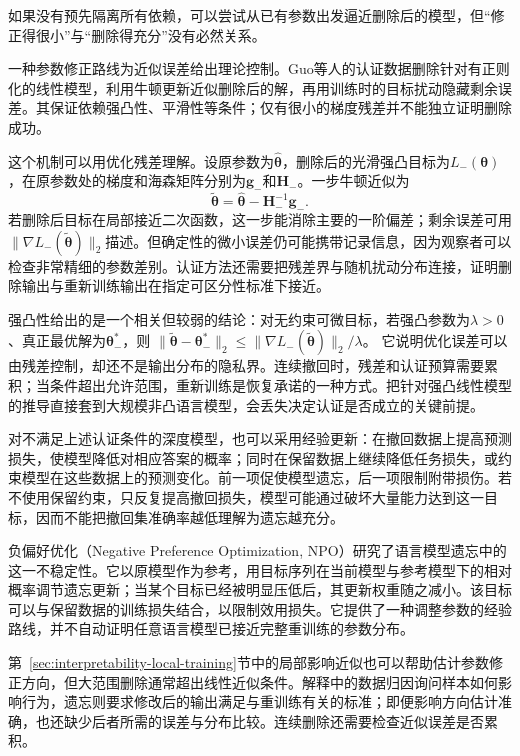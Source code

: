 如果没有预先隔离所有依赖，可以尝试从已有参数出发逼近删除后的模型，但“修正得很小”与“删除得充分”没有必然关系。

一种参数修正路线为近似误差给出理论控制。Guo等人的认证数据删除针对有正则化的线性模型，利用牛顿更新近似删除后的解，再用训练时的目标扰动隐藏剩余误差。其保证依赖强凸性、平滑性等条件；仅有很小的梯度残差并不能独立证明删除成功。

这个机制可以用优化残差理解。设原参数为$\hat{\bm\theta}$，删除后的光滑强凸目标为$L_-(\bm\theta)$，在原参数处的梯度和海森矩阵分别为$\bm g_-$和$\bm H_-$。一步牛顿近似为
\begin{equation}
 \tilde{\bm\theta}
 =\hat{\bm\theta}-\bm H_-^{-1}\bm g_-.
 \label{eq:privacy-newton-removal}
\end{equation}
若删除后目标在局部接近二次函数，这一步能消除主要的一阶偏差；剩余误差可用$\|\nabla L_-(\tilde{\bm\theta})\|_2$描述。但确定性的微小误差仍可能携带记录信息，因为观察者可以检查非常精细的参数差别。认证方法还需要把残差界与随机扰动分布连接，证明删除输出与重新训练输出在指定可区分性标准下接近。

强凸性给出的是一个相关但较弱的结论：对无约束可微目标，若强凸参数为$\lambda>0$、真正最优解为$\bm\theta_-^*$，则
$\|\tilde{\bm\theta}-\bm\theta_-^*\|_2
\leq\|\nabla L_-(\tilde{\bm\theta})\|_2/\lambda$。
它说明优化误差可以由残差控制，却还不是输出分布的隐私界。连续撤回时，残差和认证预算需要累积；当条件超出允许范围，重新训练是恢复承诺的一种方式。把针对强凸线性模型的推导直接套到大规模非凸语言模型，会丢失决定认证是否成立的关键前提。

对不满足上述认证条件的深度模型，也可以采用经验更新：在撤回数据上提高预测损失，使模型降低对相应答案的概率；同时在保留数据上继续降低任务损失，或约束模型在这些数据上的预测变化。前一项促使模型遗忘，后一项限制附带损伤。若不使用保留约束，只反复提高撤回损失，模型可能通过破坏大量能力达到这一目标，因而不能把撤回集准确率越低理解为遗忘越充分。

负偏好优化（Negative Preference Optimization, NPO）研究了语言模型遗忘中的这一不稳定性。它以原模型作为参考，用目标序列在当前模型与参考模型下的相对概率调节遗忘更新；当某个目标已经被明显压低后，其更新权重随之减小。该目标可以与保留数据的训练损失结合，以限制效用损失。它提供了一种调整参数的经验路线，并不自动证明任意语言模型已接近完整重训练的参数分布。

第~\ref{sec:interpretability-local-training}节中的局部影响近似也可以帮助估计参数修正方向，但大范围删除通常超出线性近似条件。解释中的数据归因询问样本如何影响行为，遗忘则要求修改后的输出满足与重训练有关的标准；即便影响方向估计准确，也还缺少后者所需的误差与分布比较。连续删除还需要检查近似误差是否累积。

